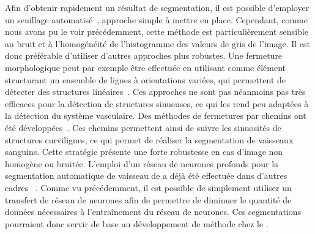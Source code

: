 \documentclass[\main/main.tex]{subfiles}
\begin{document}
%
Afin d'obtenir rapidement un résultat de segmentation, il est possible d'employer un seuillage automatisé~\cite{kugler_2019}, approche simple à mettre en place.
%
Cependant, comme nous avons pu le voir précédemment, cette méthode est particulièrement sensible au bruit et à l'homogénéité de l'histogramme des valeurs de gris de l'image. Il est donc préférable d'utiliser d'autres approches plus robustes. Une fermeture morphologique peut par exemple être effectuée en utilisant comme élément structurant un ensemble de lignes à orientations variées, qui permettent de détecter des structures linéaires~\cite{Soille_2001}. Ces approches ne sont pas néanmoins pas très efficaces pour la détection de structures sinueuses, ce qui les rend peu adaptées à la détection du système vasculaire.
%
Des méthodes de fermetures par chemins ont été développées~\cite{talbot_2007,merveille_2018}. Ces chemins permettent ainsi de suivre les sinuosités de structures curvilignes, ce qui permet de réaliser la segmentation de vaisseaux sanguins. Cette stratégie présente une forte robustesse en cas d'image non homogène ou bruitée.
%
L'emploi d'un réseau de neurones profonds pour la segmentation automatique de vaisseau de \pz{} a déjà été effectuée dans d'autres cadres ~\cite{zhang_2019a, daetwyler_2019}.
%
Comme vu précédemment, il est possible de simplement utiliser un transfert de réseau de neurones afin de permettre de diminuer le quantité de données nécessaires à l'entraînement du réseau de neurones. Ces segmentations pourraient donc servir de base au développement de méthode chez le \pz{}.
\end{document}
